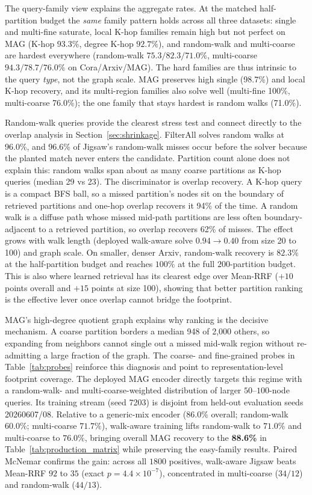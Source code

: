\documentclass[runningheads]{llncs}
\begin{document}
\label{sec:family}
The query-family view explains the aggregate rates. At the matched half-partition budget the \emph{same} family pattern holds across all three datasets: single and multi-fine saturate, local K-hop families remain high but not perfect on MAG (K-hop $93.3\%$, degree K-hop $92.7\%$), and random-walk and multi-coarse are hardest everywhere (random-walk $75.3/82.3/71.0\%$, multi-coarse $94.3/78.7/76.0\%$ on Cora/Arxiv/MAG). The hard families are thus intrinsic to the query \emph{type}, not the graph scale. MAG preserves high single (98.7\%) and local K-hop recovery, and its multi-region families also solve well (multi-fine 100\%, multi-coarse 76.0\%); the one family that stays hardest is random walks (71.0\%).

Random-walk queries provide the clearest stress test and connect directly to the overlap analysis in Section~\ref{sec:shrinkage}. FilterAll solves random walks at 96.0\%, and 96.6\% of Jigsaw's random-walk misses occur before the solver because the planted match never enters the candidate. Partition count alone does not explain this: random walks span about as many coarse partitions as K-hop queries (median 29 vs 23). The discriminator is overlap recovery. A K-hop query is a compact BFS ball, so a missed partition's nodes sit on the boundary of retrieved partitions and one-hop overlap recovers it 94\% of the time. A random walk is a diffuse path whose missed mid-path partitions are less often boundary-adjacent to a retrieved partition, so overlap recovers 62\% of misses. The effect grows with walk length (deployed walk-aware solve $0.94\!\to\!0.40$ from size 20 to 100) and graph scale. On smaller, denser Arxiv, random-walk recovery is $82.3\%$ at the half-partition budget and reaches $100\%$ at the full $200$-partition budget. This is also where learned retrieval has its clearest edge over Mean-RRF ($+10$ points overall and $+15$ points at size 100), showing that better partition ranking is the effective lever once overlap cannot bridge the footprint.

MAG's high-degree quotient graph explains why ranking is the decisive mechanism. A coarse partition borders a median 948 of 2{,}000 others, so expanding from neighbors cannot single out a missed mid-walk region without re-admitting a large fraction of the graph. The coarse- and fine-grained probes in Table~\ref{tab:probes} reinforce this diagnosis and point to representation-level footprint coverage. The deployed MAG encoder directly targets this regime with a random-walk- and multi-coarse-weighted distribution of larger $50$--$100$-node queries. Its training stream (seed 7203) is disjoint from held-out evaluation seeds 20260607/08. Relative to a generic-mix encoder ($86.0\%$ overall; random-walk $60.0\%$; multi-coarse $71.7\%$), walk-aware training lifts random-walk to $71.0\%$ and multi-coarse to $76.0\%$, bringing overall MAG recovery to the \textbf{88.6\%} in Table~\ref{tab:production_matrix} while preserving the easy-family results. Paired McNemar confirms the gain: across all $1800$ positives, walk-aware Jigsaw beats Mean-RRF $92$ to $35$ (exact $p{=}4.4{\times}10^{-7}$), concentrated in multi-coarse ($34/12$) and random-walk ($44/13$).
\end{document}
